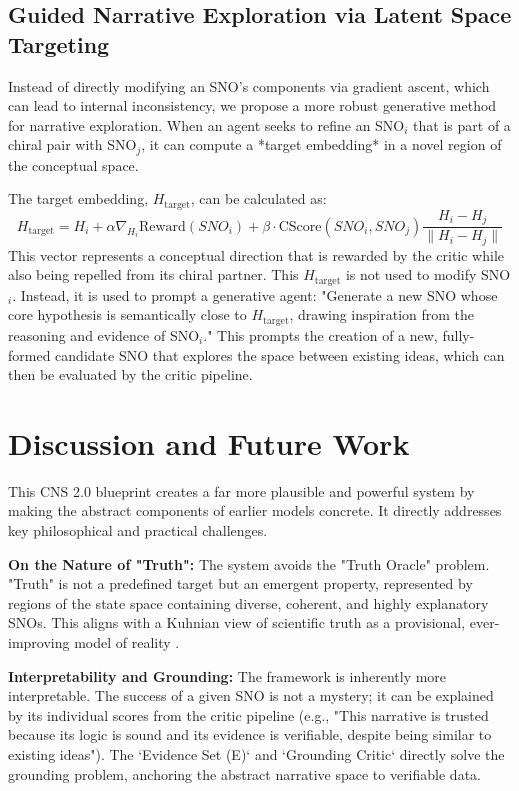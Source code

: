 \documentclass[12pt, a4paper]{article}
\begin{document}
\subsection{Guided Narrative Exploration via Latent Space Targeting}
Instead of directly modifying an SNO's components via gradient ascent, which can lead to internal inconsistency, we propose a more robust generative method for narrative exploration. When an agent seeks to refine an SNO$_i$ that is part of a chiral pair with SNO$_j$, it can compute a *target embedding* in a novel region of the conceptual space.

The target embedding, $H_{\text{target}}$, can be calculated as:
\begin{equation} \label{eq:crga_reworked}
H_{\text{target}} = H_{i} + \alpha \nabla_{H_i} \text{Reward}(SNO_i) + \beta \cdot \text{CScore}(SNO_i, SNO_j) \frac{H_{i} - H_{j}}{\|H_{i} - H_{j}\|}
\end{equation}
This vector represents a conceptual direction that is rewarded by the critic while also being repelled from its chiral partner. This $H_{\text{target}}$ is not used to modify SNO$_i$. Instead, it is used to prompt a generative agent: "Generate a new SNO whose core hypothesis is semantically close to $H_{\text{target}}$, drawing inspiration from the reasoning and evidence of SNO$_i$." This prompts the creation of a new, fully-formed candidate SNO that explores the space between existing ideas, which can then be evaluated by the critic pipeline.


\section{Discussion and Future Work}
This CNS 2.0 blueprint creates a far more plausible and powerful system by making the abstract components of earlier models concrete. It directly addresses key philosophical and practical challenges.

\textbf{On the Nature of "Truth":} The system avoids the "Truth Oracle" problem. "Truth" is not a predefined target but an emergent property, represented by regions of the state space containing diverse, coherent, and highly explanatory SNOs. This aligns with a Kuhnian view of scientific truth as a provisional, ever-improving model of reality \cite{Kuhn1962}.

\textbf{Interpretability and Grounding:} The framework is inherently more interpretable. The success of a given SNO is not a mystery; it can be explained by its individual scores from the critic pipeline (e.g., "This narrative is trusted because its logic is sound and its evidence is verifiable, despite being similar to existing ideas"). The `Evidence Set (E)` and `Grounding Critic` directly solve the grounding problem, anchoring the abstract narrative space to verifiable data.
\end{document}
